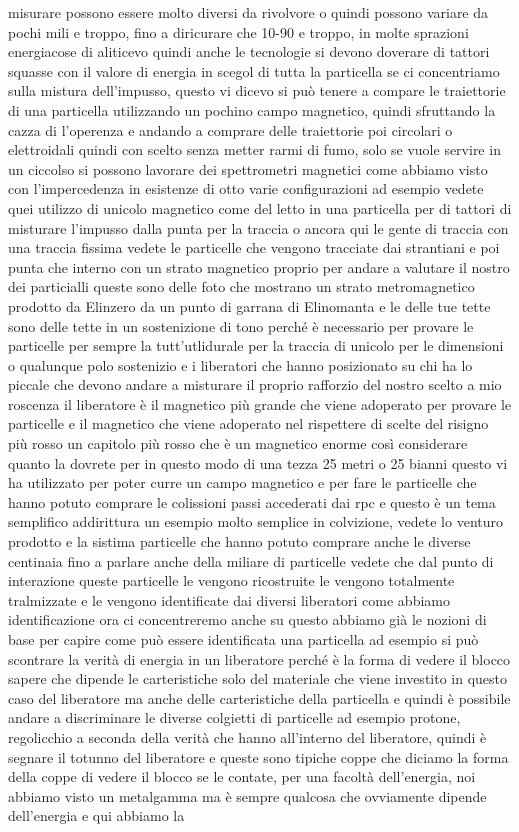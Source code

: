 misurare possono essere molto diversi da rivolvore o quindi possono variare da pochi mili e troppo, fino a diricurare che 10-90 e troppo, in molte sprazioni energiacose di aliticevo quindi anche le tecnologie si devono doverare di tattori squasse con il valore di energia in scegol di tutta la particella se ci concentriamo sulla mistura dell'impusso, questo vi dicevo si può tenere a compare le traiettorie di una particella utilizzando un pochino campo magnetico, quindi sfruttando la cazza di l'operenza e andando a comprare delle traiettorie poi circolari o elettroidali quindi con scelto senza metter rarmi di fumo, solo se vuole servire in un ciccolso si possono lavorare dei spettrometri magnetici come abbiamo visto con l'impercedenza in esistenze di otto varie configurazioni ad esempio vedete quei utilizzo di unicolo magnetico come del letto in una particella per di tattori di misturare l'impusso dalla punta per la traccia o ancora qui le gente di traccia con una traccia fissima vedete le particelle che vengono tracciate dai strantiani e poi punta che interno con un strato magnetico proprio per andare a valutare il nostro dei particialli queste sono delle foto che mostrano un strato metromagnetico prodotto da Elinzero da un punto di garrana di Elinomanta e le delle tue tette sono delle tette in un sostenizione di tono perché è necessario per provare le particelle per sempre la tutt'utlidurale per la traccia di unicolo per le dimensioni o qualunque polo sostenizio e i liberatori che hanno posizionato su chi ha lo piccale che devono andare a misturare il proprio rafforzio del nostro scelto a mio roscenza il liberatore è il magnetico più grande che viene adoperato per provare le particelle e il magnetico che viene adoperato nel rispettere di scelte del risigno più rosso un capitolo più rosso che è un magnetico enorme così considerare quanto la dovrete per in questo modo di una tezza 25 metri o 25 bianni questo vi ha utilizzato per poter curre un campo magnetico e per fare le particelle che hanno potuto comprare le colissioni passi accederati dai rpc e questo è un tema semplifico addirittura un esempio molto semplice in colvizione, vedete lo venturo prodotto e la sistima particelle che hanno potuto comprare anche le diverse centinaia fino a parlare anche della miliare di particelle vedete che dal punto di interazione queste particelle le vengono ricostruite le vengono totalmente tralmizzate e le vengono identificate dai diversi liberatori come abbiamo identificazione ora ci concentreremo anche su questo abbiamo già le nozioni di base per capire come può essere identificata una particella ad esempio si può scontrare la verità di energia in un liberatore perché è la forma di vedere il blocco sapere che dipende le carteristiche solo del materiale che viene investito in questo caso del liberatore ma anche delle carteristiche della particella e quindi è possibile andare a discriminare le diverse colgietti di particelle ad esempio protone, regolicchio a seconda della verità che hanno all'interno del liberatore, quindi è segnare il totunno del liberatore e queste sono tipiche coppe che diciamo la forma della coppe di vedere il blocco se le contate, per una facoltà dell'energia, noi abbiamo visto un metalgamma ma è sempre qualcosa che ovviamente dipende dell'energia e qui abbiamo la 